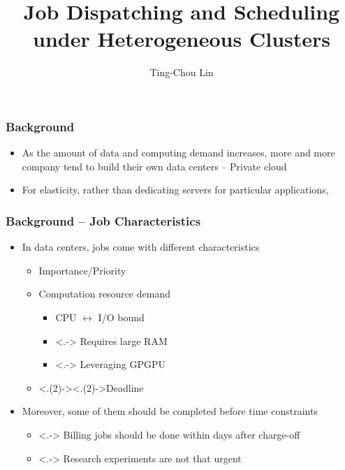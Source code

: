 \documentclass{beamer}
\title{Job Dispatching and Scheduling under Heterogeneous Clusters}
\author{Ting-Chou Lin}
\begin{document}
\begin{frame}
  \titlepage
  \label{title-page}
\end{frame}
\begin{frame}
  \frametitle{Background}
  \begin{itemize}[<+->]
    \item As the amount of data and computing demand increases, more and
      more company tend to build their own data centers -- Private cloud
    \item For elasticity, rather than dedicating servers for particular
      applications, %
  \end{itemize}
\end{frame}
\begin{frame}
  \frametitle{Background -- Job Characteristics}
  \begin{itemize}[<+->]
    \item In data centers, jobs come with different characteristics
      \begin{itemize}
        \item Importance/Priority
        \item Computation resource demand
          \begin{itemize}
            \item CPU $\leftrightarrow$ I/O bound
            \item <.-> Requires large RAM
            \item <.-> Leveraging GPGPU
          \end{itemize}
        \item <.(2)->{\alert<.(2)->{Deadline}}
      \end{itemize}
    \item Moreover, some of them should be completed before time
      constraints
      \begin{itemize}
        \item <.-> Billing jobs should be done within days after charge-off
        \item <.-> Research experiments are not that urgent
      \end{itemize}
  \end{itemize}
\end{frame}
\end{document}
